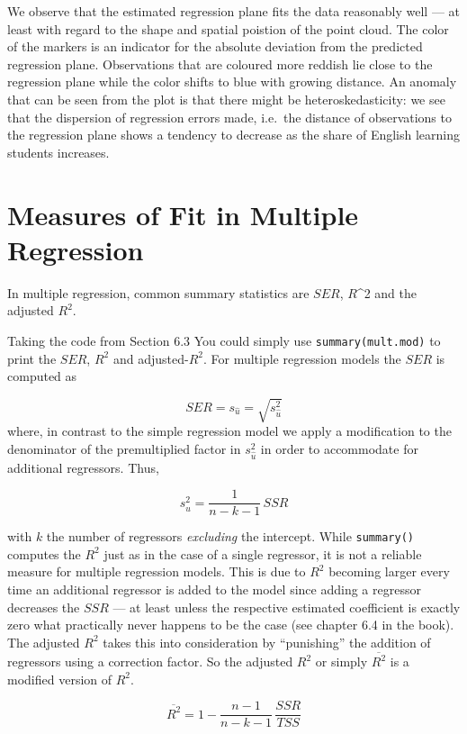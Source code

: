 \documentclass[]{book}
\theoremstyle{definition}
\theoremstyle{definition}
\theoremstyle{definition}
\theoremstyle{remark}
\begin{document}
We observe that the estimated regression plane fits the data reasonably
well --- at least with regard to the shape and spatial poistion of the
point cloud. The color of the markers is an indicator for the absolute
deviation from the predicted regression plane. Observations that are
coloured more reddish lie close to the regression plane while the color
shifts to blue with growing distance. An anomaly that can be seen from
the plot is that there might be heteroskedasticity: we see that the
dispersion of regression errors made, i.e.~the distance of observations
to the regression plane shows a tendency to decrease as the share of
English learning students increases.

\section{Measures of Fit in Multiple
Regression}\label{measures-of-fit-in-multiple-regression}

In multiple regression, common summary statistics are \(SER\),
\(R\)\^{}2 and the adjusted \(R^2\).

Taking the code from Section 6.3 You could simply use
\texttt{summary(mult.mod)} to print the \(SER\), \(R^2\) and
adjusted-\(R^2\). For multiple regression models the \(SER\) is computed
as

\[ SER = s_{\hat u} = \sqrt{s_{\hat u}^2} \] where, in contrast to the
simple regression model we apply a modification to the denominator of
the premultiplied factor in \(s_{\hat u}^2\) in order to accommodate for
additional regressors. Thus,

\[ s_{\hat u}^2 = \frac{1}{n-k-1} \, SSR \]

with \(k\) the number of regressors \emph{excluding} the intercept.
While \texttt{summary()} computes the \(R^2\) just as in the case of a
single regressor, it is not a reliable measure for multiple regression
models. This is due to \(R^2\) becoming larger every time an additional
regressor is added to the model since adding a regressor decreases the
\(SSR\) --- at least unless the respective estimated coefficient is
exactly zero what practically never happens to be the case (see chapter
6.4 in the book). The adjusted \(R^2\) takes this into consideration by
``punishing'' the addition of regressors using a correction factor. So
the adjusted \(R^2\) or simply \(\overline{R^2}\) is a modified version
of \(R^2\).

\[ \overline{R^2} = 1-\frac{n-1}{n-k-1} \, \frac{SSR}{TSS} \]
\end{document}
